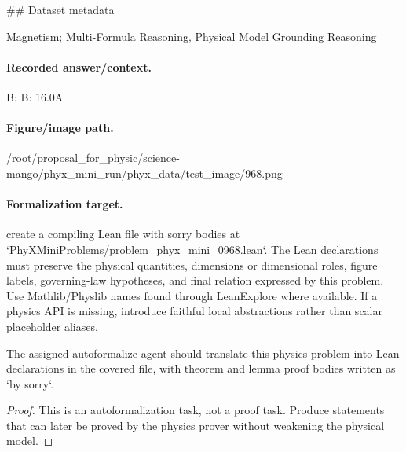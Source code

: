 \#\# Dataset metadata

Magnetism; Multi-Formula Reasoning, Physical Model Grounding Reasoning

\paragraph{Recorded answer/context.}
B: B: 16.0A

\paragraph{Figure/image path.}
/root/proposal\_for\_physic/science-mango/phyx\_mini\_run/phyx\_data/test\_image/968.png

\paragraph{Formalization target.}
create a compiling Lean file with sorry bodies at `PhyXMiniProblems/problem\_phyx\_mini\_0968.lean`. The Lean declarations must preserve the physical quantities, dimensions or dimensional roles, figure labels, governing-law hypotheses, and final relation expressed by this problem.
Use Mathlib/Physlib names found through LeanExplore where available. If a physics API is missing, introduce faithful local abstractions rather than scalar placeholder aliases.

\begin{theorem}
\label{thm:physics:phyx_mini_0968:target}
The assigned autoformalize agent should translate this physics problem into Lean declarations in the covered file, with theorem and lemma proof bodies written as `by sorry`.
\end{theorem}
\begin{proof}
This is an autoformalization task, not a proof task. Produce statements that can later be proved by the physics prover without weakening the physical model.
\end{proof}

